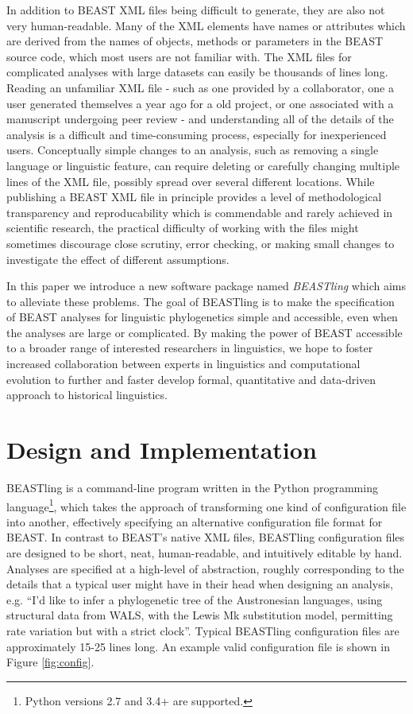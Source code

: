 \documentclass[twocolumn,10pt]{scrartcl}
\begin{document}
In addition to BEAST XML files being difficult to generate, they are also not very human-readable.  Many of the XML elements have names or attributes which are derived from the names of objects, methods or parameters in the BEAST source code, which most users are not familiar with.  The XML files for complicated analyses with large datasets can easily be thousands of lines long.  Reading an unfamiliar XML file - such as one provided by a collaborator, one a user generated themselves a year ago for a old project, or one associated with a manuscript undergoing peer review - and understanding all of the details of the analysis is a difficult and time-consuming process, especially for inexperienced users.  Conceptually simple changes to an analysis, such as removing a single language or linguistic feature, can require deleting or carefully changing multiple lines of the XML file, possibly spread over several different locations.  While publishing a BEAST XML file in principle provides a level of methodological transparency and reproducability which is commendable and rarely achieved in scientific research, the practical difficulty of working with the files might sometimes discourage close scrutiny, error checking, or making small changes to investigate the effect of different assumptions.

In this paper we introduce a new software package named \emph{BEASTling} which aims to alleviate these problems.  The goal of BEASTling is to make the specification of BEAST analyses for linguistic phylogenetics simple and accessible, even when the analyses are large or complicated.  By making the power of BEAST accessible to a broader range of interested researchers in linguistics, we hope to foster increased collaboration between experts in linguistics and computational evolution to further and faster develop formal, quantitative and data-driven approach to historical linguistics.

\section{Design and Implementation}

BEASTling is a command-line program written in the Python programming language\footnote{Python versions 2.7 and 3.4+ are supported.}, which takes the approach of transforming one kind of configuration file into another, effectively specifying an alternative configuration file format for BEAST.  In contrast to BEAST's native XML files, BEASTling configuration files are designed to be short, neat, human-readable, and intuitively editable by hand.  Analyses are specified at a high-level of abstraction, roughly corresponding to the details that a typical user might have in their head when designing an analysis, e.g. ``I'd like to infer a phylogenetic tree of the Austronesian languages, using structural data from WALS, with the Lewis Mk substitution model, permitting rate variation but with a strict clock''.  Typical BEASTling configuration files are approximately 15-25 lines long.  An example valid configuration file is shown in Figure \ref{fig:config}.
\end{document}

